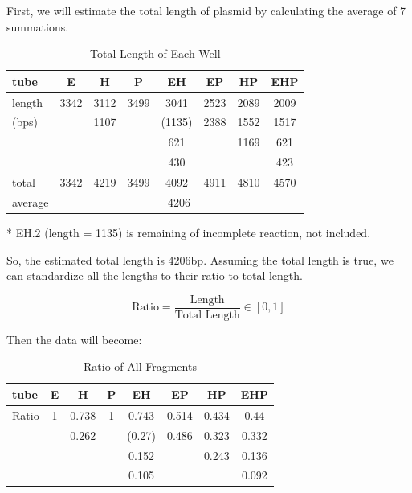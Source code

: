 \documentclass{article}
\begin{document}
            First, we will estimate the total length of plasmid by calculating the average of 7 summations.
            \begin{table}[H]
                \centering
                \caption{Total Length of Each Well}
                \begin{threeparttable}
                    \begin{tabular}{|l|c|c|c|c|c|c|c|}
                        \hline
                        tube&E&H&P&EH&EP&HP&EHP\\
                        \hline
                        length&3342&3112&3499&3041&2523&2089&2009\\
                        (bps)&&1107&&(1135)&2388&1552&1517\\
                        &&&&621&&1169&621\\
                        &&&&430&&&423\\
                        \hline
                        total&3342&4219&3499&4092\tnote{*}&4911&4810&4570\\
                        \hline
                        average&\multicolumn{7}{|c|}{4206}\\
                        \hline
                    \end{tabular}
                    \begin{tablenotes}
                        \footnotesize
                        \item[*] EH.2 (length = 1135) is remaining of incomplete reaction, not included.
                    \end{tablenotes}
                \end{threeparttable}
                \label{data.len.table.total}
            \end{table}

            So, the estimated total length is 4206bp. Assuming the total length is true, we can standardize all the lengths to their ratio to total length.

            $$\text{Ratio} = \frac{\text{Length}}{\text{Total Length}} \in [0, 1]$$

            Then the data will become:
            \begin{table}[H]
                \caption{Ratio of All Fragments}
                \centering
                \begin{tabular}{|l|c|c|c|c|c|c|c|}
                    \hline
                    tube&E&H&P&EH&EP&HP&EHP\\
                    \hline
                    Ratio&1&0.738&1&0.743&0.514&0.434&0.44\\
                    &&0.262&&(0.27)&0.486&0.323&0.332\\
                    &&&&0.152&&0.243&0.136\\
                    &&&&0.105&&&0.092\\
                    \hline
                \end{tabular}
                \label{data.ratio}
            \end{table}
\end{document}
